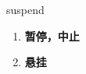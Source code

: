 
\begin{frame}
{\huge suspend}
\begin{center}
\begin{enumerate}\Large
  \item \textbf{暂停，中止}
  \item \textbf{悬挂}
\end{enumerate}
\end{center}
\end{frame}
